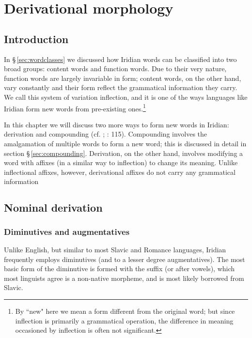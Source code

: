 \chapter{Derivational morphology}

\section{Introduction}

In \S\,\ref{sec:wordclasses} we discussed how Iridian words can be classified into two broad groups: content words and function words. Due to their very nature, function words are largely invariable in form; content words, on the other hand, vary constantly and their form reflect the grammatical information they carry. We call this system of variation {\sc inflection}, and it is one of the ways languages like Iridian form new words from pre-existing ones.\footnote{By ``new" here we mean a form different from the original word; but since inflection is primarily a grammatical operation, the difference in meaning occasioned by inflection is often not significant.}

In this chapter we will discuss two more ways to form new words in Iridian: {\sc derivation} and {\sc compounding} (cf. \cite{booij2005}; \cite{velupillai2012}: 115). Compounding involves the amalgamation of multiple words to form a new word; this is discussed in detail in section \S\,\ref{sec:compounding}. Derivation, on the other hand, involves modifying a word with affixes (in a similar way to inflection) to change its meaning. Unlike inflectional affixes, however, derivational affixes do not carry any grammatical information

\section{Nominal derivation}
\subsection{Diminutives and augmentatives}\label{sec:diminutive}

Unlike English, but similar to most Slavic and Romance languages, Iridian frequently employs {\sc diminutives} (and to a lesser degree {\sc augmentatives}). The most basic form of the diminutive is formed with the suffix  (or  after vowels), which most linguists agree is a non-native morpheme, and is most likely borrowed from Slavic.


